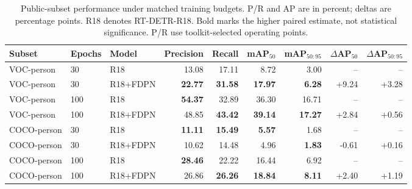 \begin{table}[t]
\centering
\caption{Public-subset performance under matched training budgets. P/R and AP are in percent; deltas are percentage points. R18 denotes RT-DETR-R18. Bold marks the higher paired estimate, not statistical significance. P/R use toolkit-selected operating points.}
\label{tab:public_results}
\small
\setlength{\tabcolsep}{5pt}
\begin{tabular}{lllrrrrrr}
\toprule
Subset & Epochs & Model & Precision & Recall & mAP$_{50}$ & mAP$_{50:95}$ & $\Delta$AP$_{50}$ & $\Delta$AP$_{50:95}$\\
\midrule
VOC-person & 30 & R18 & 13.08 & 17.11 & 8.72 & 3.00 & -- & --\\
VOC-person & 30 & R18+FDPN & \textbf{22.77} & \textbf{31.58} & \textbf{17.97} & \textbf{6.28} & +9.24 & +3.28\\
VOC-person & 100 & R18 & \textbf{54.37} & 32.89 & 36.30 & 16.71 & -- & --\\
VOC-person & 100 & R18+FDPN & 48.85 & \textbf{43.42} & \textbf{39.14} & \textbf{17.27} & +2.84 & +0.56\\
\midrule
COCO-person & 30 & R18 & \textbf{11.11} & \textbf{15.49} & \textbf{5.57} & 1.68 & -- & --\\
COCO-person & 30 & R18+FDPN & 10.62 & 14.48 & 4.96 & \textbf{1.83} & -0.61 & +0.16\\
COCO-person & 100 & R18 & \textbf{28.46} & 22.22 & 16.44 & 6.92 & -- & --\\
COCO-person & 100 & R18+FDPN & 26.86 & \textbf{26.26} & \textbf{18.84} & \textbf{8.11} & +2.40 & +1.19\\
\bottomrule
\end{tabular}
\end{table}
